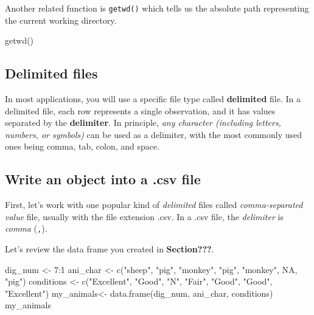 \documentclass[
]{book}
\newenvironment{Shaded}{\begin{snugshade}}{\end{snugshade}}
\newcommand{\ConstantTok}[1]{\textcolor[rgb]{0.00,0.00,0.00}{#1}}
\newcommand{\DecValTok}[1]{\textcolor[rgb]{0.00,0.00,0.81}{#1}}
\newcommand{\FunctionTok}[1]{\textcolor[rgb]{0.00,0.00,0.00}{#1}}
\newcommand{\NormalTok}[1]{#1}
\newcommand{\OtherTok}[1]{\textcolor[rgb]{0.56,0.35,0.01}{#1}}
\newcommand{\SpecialCharTok}[1]{\textcolor[rgb]{0.00,0.00,0.00}{#1}}
\newcommand{\StringTok}[1]{\textcolor[rgb]{0.31,0.60,0.02}{#1}}
\begin{document}
Another related function is \texttt{getwd()} which tells us the absolute path representing the current working directory.

\begin{Shaded}
\begin{Highlighting}[]
\FunctionTok{getwd}\NormalTok{()}
\end{Highlighting}
\end{Shaded}

\hypertarget{delimited-files}{%
\subsection{Delimited files}\label{delimited-files}}

In most applications, you will use a specific file type called \textbf{delimited} file. In a delimited file, each row represents a single observation, and it has values separated by the \textbf{delimiter}. In principle, \emph{any character (including letters, numbers, or symbols)} can be used as a delimiter, with the most commonly used ones being comma, tab, colon, and space.

\hypertarget{write-an-object-into-a-.csv-file}{%
\subsection{Write an object into a .csv file}\label{write-an-object-into-a-.csv-file}}

First, let's work with one popular kind of \emph{delimited} files called \emph{comma-separated value} file, usually with the file extension .csv. In a .csv file, the \emph{delimiter} is \emph{comma} (\texttt{,}).

Let's review the data frame you created in \textbf{Section???}.

\begin{Shaded}
\begin{Highlighting}[]
\NormalTok{dig\_num }\OtherTok{\textless{}{-}} \DecValTok{7}\SpecialCharTok{:}\DecValTok{1}
\NormalTok{ani\_char }\OtherTok{\textless{}{-}} \FunctionTok{c}\NormalTok{(}\StringTok{"sheep"}\NormalTok{, }\StringTok{"pig"}\NormalTok{, }\StringTok{"monkey"}\NormalTok{, }\StringTok{"pig"}\NormalTok{, }\StringTok{"monkey"}\NormalTok{, }\ConstantTok{NA}\NormalTok{, }\StringTok{"pig"}\NormalTok{)}
\NormalTok{conditions }\OtherTok{\textless{}{-}} \FunctionTok{c}\NormalTok{(}\StringTok{"Excellent"}\NormalTok{, }\StringTok{"Good"}\NormalTok{, }\StringTok{"N"}\NormalTok{, }\StringTok{"Fair"}\NormalTok{, }\StringTok{"Good"}\NormalTok{, }\StringTok{"Good"}\NormalTok{, }\StringTok{"Excellent"}\NormalTok{)}
\NormalTok{my\_animals}\OtherTok{\textless{}{-}} \FunctionTok{data.frame}\NormalTok{(dig\_num, ani\_char, conditions)}
\NormalTok{my\_animals}
\end{Highlighting}
\end{Shaded}
\end{document}
